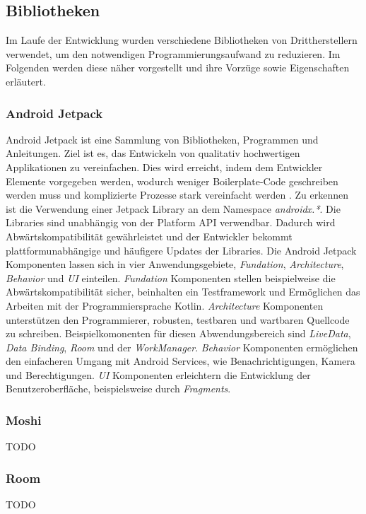 \documentclass[a4paper]{article}
\begin{document}
\subsection{Bibliotheken}
\label{subsec:technologies:bibs}
Im Laufe der Entwicklung wurden verschiedene Bibliotheken von Drittherstellern verwendet, um den notwendigen Programmierungsaufwand zu reduzieren.
Im Folgenden werden diese näher vorgestellt und ihre Vorzüge sowie Eigenschaften erläutert.


\subsubsection{Android Jetpack}
\label{subsubsec:technologies:bibs:jetpack}
Android Jetpack ist eine Sammlung von Bibliotheken, Programmen und Anleitungen. Ziel ist es, das Entwickeln von qualitativ hochwertigen Applikationen zu vereinfachen. Dies wird erreicht, indem dem Entwickler Elemente vorgegeben werden, wodurch weniger Boilerplate-Code geschreiben werden muss und komplizierte Prozesse stark vereinfacht werden \cite{android_jetpack}. Zu erkennen ist die Verwendung einer Jetpack Library an dem Namespace \textit{androidx.*}. Die Libraries sind unabhängig von der Platform API verwendbar. Dadurch wird Abwärtskompatibilität gewährleistet und der Entwickler bekommt plattformunabhängige und häufigere Updates der Libraries. Die Android Jetpack Komponenten lassen sich in vier Anwendungsgebiete, \textit{Fundation}, \textit{Architecture}, \textit{Behavior} und \textit{UI} einteilen. \textit{Fundation} Komponenten stellen beispielweise die Abwärtskompatibilität sicher, beinhalten ein Testframework und Ermöglichen das Arbeiten mit der Programmiersprache Kotlin. \textit{Architecture} Komponenten unterstützen den Programmierer, robusten, testbaren und wartbaren Quellcode zu schreiben. Beispielkomonenten für diesen Abwendungsbereich sind \textit{LiveData}, \textit{Data Binding}, \textit{Room} und der \textit{WorkManager}. \textit{Behavior} Komponenten ermöglichen den einfacheren Umgang mit Android Services, wie Benachrichtigungen, Kamera und Berechtigungen. \textit{UI} Komponenten erleichtern die Entwicklung der Benutzeroberfläche, beispielsweise durch \textit{Fragments}.


\subsubsection{Moshi}
\label{subsubsec:technologies:bibs:moshi}
TODO


\subsubsection{Room}
\label{subsubsec:technologies:bibs:room}
TODO
\end{document}
